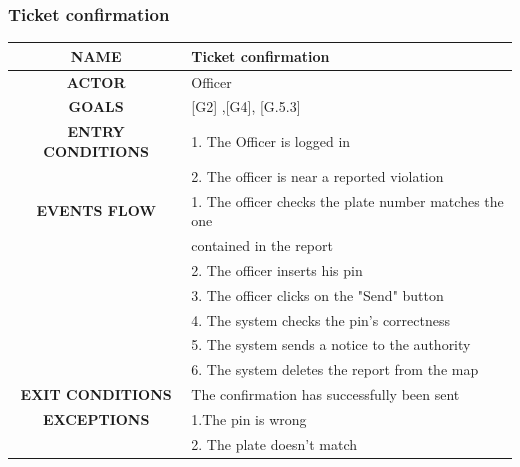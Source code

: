 \documentclass[12pt,a4paper]{article}
\begin{document}
\subsubsection{Ticket confirmation}
		\begin{center}
			\begin{tabular}{| c | l |}
				\hline
				\textbf{NAME} & Ticket confirmation \\
				\hline
				\textbf{ACTOR} & Officer \\
				\hline
				\textbf{GOALS} & [G2] ,[G4], [G.5.3] \\
				\hline
				\textbf{ENTRY CONDITIONS} &1. The Officer is logged in \\
				&2. The officer is near a reported violation \\\hline
				\textbf{EVENTS FLOW}  &
				1. The officer checks the plate number matches the one \\
				& contained in the report\\ 
				&2. The officer inserts his pin \\
				&3. The officer clicks on the "Send" button\\	
				&4. The system checks the pin's correctness \\
				&5. The system sends a notice to the authority \\
				&6. The system deletes the report from the map \\ 
				\hline
				\textbf{EXIT CONDITIONS}  & The confirmation has successfully been sent \\ \hline
				\textbf{EXCEPTIONS} &
			 	1.The pin is wrong \\
				&2. The plate doesn't match\\
				\hline
			\end{tabular}
		\end{center}
\end{document}
